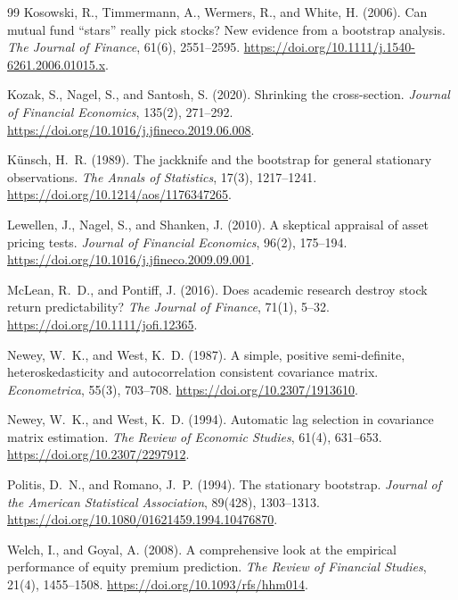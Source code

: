 \documentclass[11pt]{article}
\begin{document}
\begin{thebibliography}{99}
Kosowski, R., Timmermann, A., Wermers, R., and White, H. (2006).
Can mutual fund ``stars'' really pick stocks? New evidence from a bootstrap
analysis.
\textit{The Journal of Finance}, 61(6), 2551--2595.
\href{https://doi.org/10.1111/j.1540-6261.2006.01015.x}{https://doi.org/10.1111/j.1540-6261.2006.01015.x}.

Kozak, S., Nagel, S., and Santosh, S. (2020).
Shrinking the cross-section.
\textit{Journal of Financial Economics}, 135(2), 271--292.
\href{https://doi.org/10.1016/j.jfineco.2019.06.008}{https://doi.org/10.1016/j.jfineco.2019.06.008}.

K\"unsch, H.\ R. (1989).
The jackknife and the bootstrap for general stationary observations.
\textit{The Annals of Statistics}, 17(3), 1217--1241.
\href{https://doi.org/10.1214/aos/1176347265}{https://doi.org/10.1214/aos/1176347265}.

Lewellen, J., Nagel, S., and Shanken, J. (2010).
A skeptical appraisal of asset pricing tests.
\textit{Journal of Financial Economics}, 96(2), 175--194.
\href{https://doi.org/10.1016/j.jfineco.2009.09.001}{https://doi.org/10.1016/j.jfineco.2009.09.001}.

McLean, R.\ D., and Pontiff, J. (2016).
Does academic research destroy stock return predictability?
\textit{The Journal of Finance}, 71(1), 5--32.
\href{https://doi.org/10.1111/jofi.12365}{https://doi.org/10.1111/jofi.12365}.

Newey, W.\ K., and West, K.\ D. (1987).
A simple, positive semi-definite, heteroskedasticity and autocorrelation
consistent covariance matrix.
\textit{Econometrica}, 55(3), 703--708.
\href{https://doi.org/10.2307/1913610}{https://doi.org/10.2307/1913610}.

Newey, W.\ K., and West, K.\ D. (1994).
Automatic lag selection in covariance matrix estimation.
\textit{The Review of Economic Studies}, 61(4), 631--653.
\href{https://doi.org/10.2307/2297912}{https://doi.org/10.2307/2297912}.

Politis, D.\ N., and Romano, J.\ P. (1994).
The stationary bootstrap.
\textit{Journal of the American Statistical Association}, 89(428), 1303--1313.
\href{https://doi.org/10.1080/01621459.1994.10476870}{https://doi.org/10.1080/01621459.1994.10476870}.

Welch, I., and Goyal, A. (2008).
A comprehensive look at the empirical performance of equity premium prediction.
\textit{The Review of Financial Studies}, 21(4), 1455--1508.
\href{https://doi.org/10.1093/rfs/hhm014}{https://doi.org/10.1093/rfs/hhm014}.

\end{thebibliography}
\end{document}
